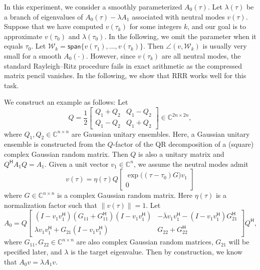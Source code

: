 \documentclass[a4paper,11pt]{article}
\newcommand{\Htran}{\mathsf{H}}
\newcommand{\C}{\mathbb{C}}
\providecommand{\spa}[1]{\mathsf{span}\{#1\}}
\providecommand{\norm}[1]{\lVert#1\rVert}
\begin{document}
In this experiment, we consider a smoothly parameterized $A_{0}(\tau)$. Let $\lambda(\tau)$ be a branch of eigenvalues of $A_{0}(\tau)-\lambda A_{1}$ associated with neutral modes $v(\tau)$. Suppose that we have computed $v(\tau_{k})$ for some integers $k$, and our goal is to approximate $v(\tau_{0})$ and $\lambda(\tau_{0})$. In the following, we omit the parameter when it equals $\tau_{0}$. Let $\mathcal{W}_{k}=\spa{v(\tau_{1}),\dotsc,v(\tau_{k})}$. Then $\angle(v,\mathcal{W}_{k})$ is usually very small for a smooth $A_{0}(\cdot)$. However, since $v(\tau_{k})$ are all neutral modes, the standard Rayleigh--Ritz procedure fails in exact arithmetic as the compressed matrix pencil vanishes. In the following, we show that RRR works well for this task.

We construct an example as follows: Let 
\begin{equation*}
    Q = \frac{1}{2}\begin{bmatrix}
        Q_{1}+Q_{2} & Q_{1}-Q_{2}\\ 
        Q_{1}-Q_{2} & Q_{1}+Q_{2}
    \end{bmatrix}\in\C^{2n\times 2n},
\end{equation*}
where $Q_{1},Q_{2}\in\C^{n\times n}$ are Gaussian unitary ensembles.
Here, a Gaussian unitary ensemble is constructed from the $Q$-factor of the QR decomposition of a (square) complex Gaussian random matrix. 
Then $Q$ is also a unitary matrix and $Q^{\Htran}A_{1}Q=A_{1}$. 
Given a unit vector $v_{1}\in\C^{n}$, we assume the neutral modes admit 
\begin{equation*}
    v(\tau) = \eta(\tau)Q\begin{bmatrix}
        \exp\bigl((\tau-\tau_{0}) G\bigr)v_{1}\\ 0
    \end{bmatrix}
\end{equation*}
where $G\in\C^{n\times n}$ is a complex Gaussian random matrix.
Here $\eta(\tau)$ is a normalization factor such that $\norm{v(\tau)}=1$. Let 
\begin{equation}
    \label{eq:defHam}
    A_{0} = Q\begin{bmatrix}
        (I-v_{1}v_{1}^{\Htran})(G_{11}+G_{11}^{\Htran})(I-v_{1}v_{1}^{\Htran}) &-\overline{\lambda} v_{1}v_{1}^{\Htran}-(I-v_{1}v_{1}^{\Htran})G_{21}^{\Htran} \\ 
        \lambda v_{1}v_{1}^{\Htran}+G_{21}(I-v_{1}v_{1}^{\Htran}) &G_{22}+G_{22}^{\Htran}
    \end{bmatrix}Q^{\Htran},
\end{equation}
where $G_{11},G_{22}\in\C^{n\times n}$ are also complex Gaussian random matrices, $G_{21}$ will be specified later, and $\lambda$ is the target eigenvalue.
Then by construction, we know that $A_{0}v=\lambda A_{1}v$. 
\end{document}

